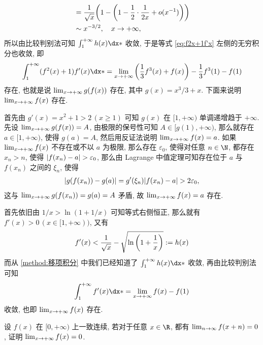 \begin{exercise}[series=exer]
\begin{answer}
\begin{method}
\begin{align*}
              & = \frac{1}{\sqrt{x}}\qty(1 - \qty(1 - \frac{1}{2} \cdot \frac{1}{2x} + o(x^{-1})))\\
              & \sim x^{-3/2}, \quad x \to +\infty,
          \end{align*}
          所以由比较判别法可知 $ \int_{1}^{+\infty} h(x) \dx* $ 收敛, 于是等式 \eqref{eq:f2x+1f'x} 左侧的无穷积分也收敛, 即
          \begin{align*}
              \int_{1}^{+\infty} (f^{2}(x) + 1)f'(x) \dx* = \limit{x}{+\infty} \qty(\frac{1}{3}f^{3}(x) + f(x)) - \frac{1}{3}f^{3}(1) - f(1)
          \end{align*}
          存在, 也就是说 $ \lim_{x \to +\infty} g(f(x)) $ 存在, 其中 $ g(x) = x^{3}/3 + x $. 下面来说明 $ \lim_{x \to +\infty} f(x) $ 存在.

          首先由 $ g'(x) = x^{2} + 1 > 2\,(x \ge 1) $ 可知 $ g(x) $ 在 $ [1, +\infty) $ 单调递增趋于 $ +\infty $. 先设 $ \lim_{x \to +\infty} g(f(x)) = A $, 由极限的保号性可知 $ A \in [g(1), +\infty) $, 那么就存在 $ a \in [1, +\infty) $, 使得 $ g(a) = A $, 然后用反证法说明 $ \lim_{x \to +\infty} f(x) = a $. 如果 $ \lim_{x \to +\infty}f(x) $ 不存在或不以 $ a $ 为极限, 那么存在 $ \varepsilon_{0} $, 使得对任意 $ n \in \N $, 都存在 $ x_{n} > n $, 使得 $ \abs{f(x_{n}) - a} > \varepsilon_{0} $, 那么由 Lagrange 中值定理可知存在位于 $ a $ 与 $ f(x_{n}) $ 之间的 $ \xi_{n} $, 使得
          \begin{align*}
              \abs{g(f(x_{n})) - g(a)} = g'(\xi_{n})\abs{f(x_{n}) - a} > 2\varepsilon_{0},
          \end{align*}
          这与 $ \lim_{x \to +\infty}g(f(x_{n})) = g(a) = A $ 矛盾, 故 $ \lim_{x \to +\infty} f(x) = a $ 存在.
          \item 首先依旧由 $ 1/x > \ln (1 + 1/x) $ 可知等式右侧恒正, 那么就有 $ f'(x) > 0\,(x \in [1, +\infty)) $, 又有
          \begin{align*}
              f'(x) < \frac{1}{\sqrt{x}} - \sqrt{\ln\qty(1 + \frac{1}{x})} := h(x)
          \end{align*}
          而从 \ref{method:移项积分} 中我们已经知道了 $ \int_{1}^{+\infty} h(x) \dx* $ 收敛, 再由比较判别法可知
          \begin{align*}
              \int_{1}^{+\infty} f'(x) \dx* = \limit{x}{+\infty}f(x) - f(1)
          \end{align*}
          收敛, 也即 $ \lim_{x \to +\infty} f(x) $ 存在.
      \end{method}
  \end{answer}
  \item\label{item:fx+n} 设 $ f(x) $ 在 $ [0, +\infty) $ 上一致连续, 若对于任意 $ x \in \R $, 都有 $ \lim_{n \to \infty} f(x + n) = 0 $, 证明 $ \lim_{x \to +\infty} f(x) = 0 $.

\end{exercise}
